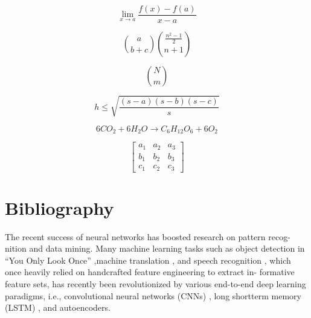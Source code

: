 \documentclass[14pt]{article}
\begin{document}
	$$\lim\limits_{x\rightarrow a}\frac{f(x)-f(a)}{x - a}$$
	
	$$\binom{a}{b + c} \binom{\frac{n^2-1}{2}}{n+1}$$
	
	$$N\choose m$$
	
	$$h\leq \sqrt{\frac{(s-a)(s-b)(s-c)}{s}}$$
	
	$$6CO_2 + 6H_2O \rightarrow C_6H_{12}O_6 + 6O_2$$
	
	\begin{equation}
	\label{eq2}
		\begin{bmatrix}
		a_1 & a_2 & a_3\\
		b_1 & b_2 & b_3\\
		c_1 & c_2 & c_3
		\end{bmatrix}
	\end{equation}
	
	
	
	
	
	
	
	
	\section{Bibliography}
	The recent success of neural networks has boosted research on pattern recog-
	nition and data mining. Many machine learning tasks such as object detection
	in “You Only Look Once” \cite{redmon2016you},machine translation \cite{luong2015effective}, and speech recognition \cite{hinton2012deep}, which once heavily relied on handcrafted feature engineering to extract in-
	formative feature sets, has recently been revolutionized by various end-to-end
	deep learning paradigms, i.e., convolutional neural networks (CNNs) \cite{lecun1995convolutional}, long
	shortterm memory (LSTM) \cite{hochreiter1997long}, and autoencoders.
	
	
	
\end{document}
